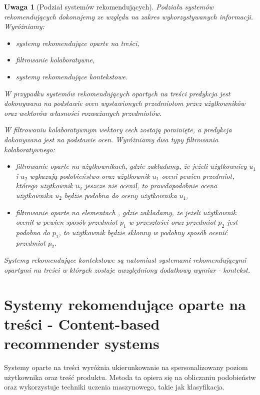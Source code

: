 \documentclass[12pt,a4paper]{report}
\newtheorem{uwaga}[df]{Uwaga}
\begin{document}
\begin{uwaga}[Podział systemów rekomendujących]
Podziału systemów rekomendujących dokonujemy ze względu na zakres wykorzystywanych informacji. Wyróżniamy:
\begin{itemize}
\item systemy rekomendujące oparte na treści,
\item filtrowanie kolaboratywne,
\item systemy rekomendujące kontekstowe.
\end{itemize}

W przypadku systemów rekomendujących opartych na treści predykcja jest dokonywana na podstawie ocen wystawionych przedmiotom przez użytkowników oraz wektorów własności rozważanych przedmiotów. 

W filtrowaniu kolaboratywnym wektory cech zostają pominięte, a predykcja dokonywana jest na podstawie ocen. Wyróżniamy dwa typy filtrowania kolaboratywnego:
\begin{itemize}
\item filtrowanie oparte na użytkownikach, gdzie zakładamy, że jeżeli użytkownicy $u_1$ i $u_2$ wykazują podobieństwo oraz użytkownik $u_1$ oceni pewien przedmiot, którego użytkownik $u_2$ jeszcze nie ocenił, to prawdopodobnie ocena użytkownika $u_2$ będzie podobna do oceny użytkownika $u_1$,
\item filtrowanie oparte na elementach , gdzie zakładamy, że jeżeli użytkownik ocenił w pewien sposób przedmiot $p_1$ w przeszłości oraz przedmiot $p_2$ jest podobna do $p_1$, to użytkownik będzie skłonny w podobny sposób ocenić przedmiot $p_2$.
\end{itemize}

Systemy rekomendujące kontekstowe są natomiast systemami rekomendującymi opartymi na treści w których zostaje uwzględniony dodatkowy wymiar - kontekst.
\end{uwaga}

\section{Systemy rekomendujące oparte na treści - Content-based recommender systems}

Systemy oparte na treści wyróżnia ukierunkowanie na spersonalizowany poziom użytkownika oraz treść produktu. Metoda ta opiera się na obliczaniu podobieństw oraz wykorzystuje techniki uczenia maszynowego, takie jak klasyfikacja.
\end{document}
